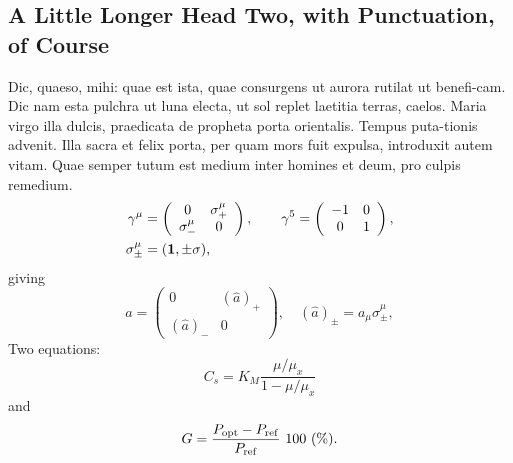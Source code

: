 \documentclass{bln}
\begin{document}
\subsection{A Little Longer Head Two, with Punctuation, of Course}

Dic, quaeso, mihi: quae est ista, quae consurgens ut aurora rutilat
ut benefi-cam.  Dic nam esta pulchra ut luna electa, ut sol replet
laetitia terras, caelos.  Maria virgo illa dulcis, praedicata de
propheta porta orientalis. Tempus puta-tionis advenit. Illa sacra et
felix porta, per quam mors fuit expulsa, introduxit autem vitam. Quae
semper tutum est medium inter homines et deum, pro culpis remedium.
%
\begin{align}
\gamma^\mu & =
\left(
%
\begin{array}{cc}
0            & \sigma^\mu_+ \\
\sigma^\mu_- & 0            
\end{array}
%
\right),
\qquad
\gamma^5= \left(
%
\begin{array}{cc}
-1 & 0 \\
0  & 1
\end{array}
%
\right),\nonumber\\
\sigma^\mu_{\pm} & = ({\bf1} ,\pm\sigma) , \nonumber
\end{align}
%
giving
%
\begin{equation}
\hat a= \left(
%
\begin{array}{cc}
0          & (\hat a)_+ \\
(\hat a)_- & 0
\end{array}
%
\right),\quad(\hat a)_\pm=a_\mu\sigma^\mu_\pm,
\end{equation}
%
Two equations:
%
\begin{equation}
C_{s} = K_{M} \frac{\mu/\mu_{x}}{1-\mu/\mu_{x}} \label{ccs}
\end{equation}
%
and
%
\begin{equation}
G = \frac{P_{\rm opt} - P_{\rm ref}}{P_{\rm ref}}\ 100\ (\%).
\end{equation}
\end{document}
